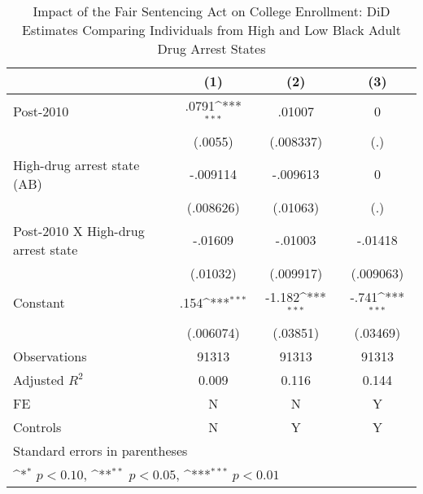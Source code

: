 \begin{table}[htbp]\centering
\def\sym#1{\ifmmode^{#1}\else\(^{#1}\)\fi}
\caption{Impact of the Fair Sentencing Act on College Enrollment: DiD Estimates Comparing Individuals from High and Low Black Adult Drug Arrest States}
\begin{tabular}{l*{3}{c}}
\hline\hline
                    &\multicolumn{1}{c}{(1)}         &\multicolumn{1}{c}{(2)}         &\multicolumn{1}{c}{(3)}         \\
\hline
Post-2010           &       .0791\sym{***}&      .01007         &           0         \\
                    &     (.0055)         &   (.008337)         &         (.)         \\
[1em]
High-drug arrest state (AB)&    -.009114         &    -.009613         &           0         \\
                    &   (.008626)         &    (.01063)         &         (.)         \\
[1em]
Post-2010 X High-drug arrest state&     -.01609         &     -.01003         &     -.01418         \\
                    &    (.01032)         &   (.009917)         &   (.009063)         \\
[1em]
Constant            &        .154\sym{***}&      -1.182\sym{***}&       -.741\sym{***}\\
                    &   (.006074)         &    (.03851)         &    (.03469)         \\
\hline
Observations        &       91313         &       91313         &       91313         \\
Adjusted \(R^{2}\)  &       0.009         &       0.116         &       0.144         \\
FE                  &           N         &           N         &           Y         \\
Controls            &           N         &           Y         &           Y         \\
\hline\hline
\multicolumn{4}{l}{\footnotesize Standard errors in parentheses}\\
\multicolumn{4}{l}{\footnotesize \sym{*} \(p<0.10\), \sym{**} \(p<0.05\), \sym{***} \(p<0.01\)}\\
\end{tabular}
\end{table}
